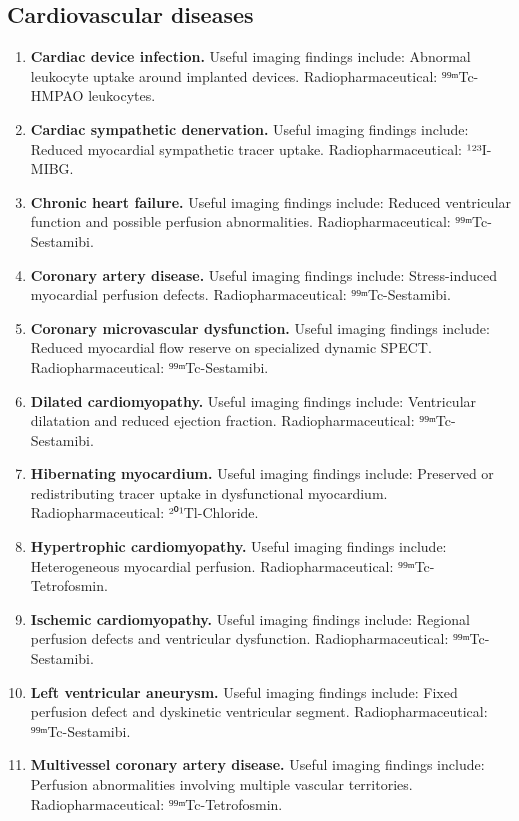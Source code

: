 \subsection{Cardiovascular diseases}
\begin{enumerate}[leftmargin=*,itemsep=0.45em,topsep=0.4em]
\item \textbf{Cardiac device infection.} Useful imaging findings include: Abnormal leukocyte uptake around implanted devices. Radiopharmaceutical: ⁹⁹ᵐTc-HMPAO leukocytes.
\item \textbf{Cardiac sympathetic denervation.} Useful imaging findings include: Reduced myocardial sympathetic tracer uptake. Radiopharmaceutical: ¹²³I-MIBG.
\item \textbf{Chronic heart failure.} Useful imaging findings include: Reduced ventricular function and possible perfusion abnormalities. Radiopharmaceutical: ⁹⁹ᵐTc-Sestamibi.
\item \textbf{Coronary artery disease.} Useful imaging findings include: Stress-induced myocardial perfusion defects. Radiopharmaceutical: ⁹⁹ᵐTc-Sestamibi.
\item \textbf{Coronary microvascular dysfunction.} Useful imaging findings include: Reduced myocardial flow reserve on specialized dynamic SPECT. Radiopharmaceutical: ⁹⁹ᵐTc-Sestamibi.
\item \textbf{Dilated cardiomyopathy.} Useful imaging findings include: Ventricular dilatation and reduced ejection fraction. Radiopharmaceutical: ⁹⁹ᵐTc-Sestamibi.
\item \textbf{Hibernating myocardium.} Useful imaging findings include: Preserved or redistributing tracer uptake in dysfunctional myocardium. Radiopharmaceutical: ²⁰¹Tl-Chloride.
\item \textbf{Hypertrophic cardiomyopathy.} Useful imaging findings include: Heterogeneous myocardial perfusion. Radiopharmaceutical: ⁹⁹ᵐTc-Tetrofosmin.
\item \textbf{Ischemic cardiomyopathy.} Useful imaging findings include: Regional perfusion defects and ventricular dysfunction. Radiopharmaceutical: ⁹⁹ᵐTc-Sestamibi.
\item \textbf{Left ventricular aneurysm.} Useful imaging findings include: Fixed perfusion defect and dyskinetic ventricular segment. Radiopharmaceutical: ⁹⁹ᵐTc-Sestamibi.
\item \textbf{Multivessel coronary artery disease.} Useful imaging findings include: Perfusion abnormalities involving multiple vascular territories. Radiopharmaceutical: ⁹⁹ᵐTc-Tetrofosmin.

\end{enumerate}

